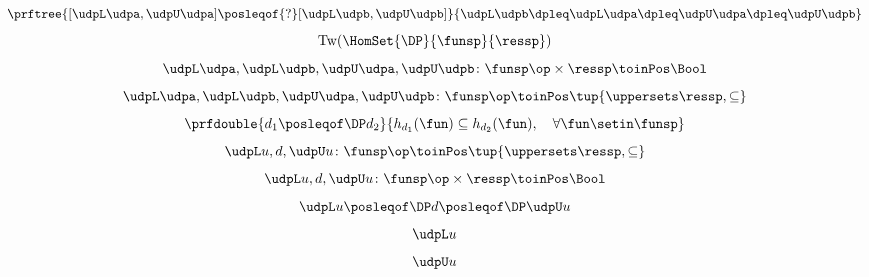 {\begin{forslides}
        \begin{equation*}
            \label{eq:order_udp_1}
            \prftree{[\udpL\udpa,\udpU\udpa] \posleqof{?} [\udpL\udpb,\udpU\udpb]}{\udpL\udpb\dpleq\udpL\udpa\dpleq\udpU\udpa\dpleq\udpU\udpb}
        \end{equation*}
        \begin{equation*}
            \label{eq:order_udp_2}
            \text{Tw}(\HomSet{\DP}{\funsp}{\ressp})
        \end{equation*}
        \begin{equation*}
            \label{eq:order_udp_3}
            \udpL\udpa,\udpL\udpb,\udpU\udpa,\udpU\udpb\colon \funsp\op \times \ressp \toinPos \Bool
        \end{equation*}
        \begin{equation*}
            \label{eq:order_udp_4}
            \udpL\udpa,\udpL\udpb,\udpU\udpa,\udpU\udpb\colon \funsp\op \toinPos  \tup{\uppersets \ressp, \subseteq}
        \end{equation*}
        \begin{equation*}
            \label{eq:upos_dp_def_4}
            \prfdouble{d_1\posleqof\DP d_2}{h_{d_1}(\fun)\subseteq h_{d_2}(\fun), \quad \forall \fun \setin \funsp}
        \end{equation*}
        \begin{equation*}
            \label{eq:order_udp_5}
            \udpL u,d,\udpU u\colon \funsp\op \toinPos  \tup{\uppersets \ressp, \subseteq}
        \end{equation*}
        \begin{equation*}
            \label{eq:order_udp_6}
            \udpL u,d,\udpU u\colon  \funsp\op \times \ressp \toinPos \Bool
        \end{equation*}
        \begin{equation*}
            \label{eq:order_udp_7}
            \udpL u \posleqof\DP d \posleqof\DP \udpU u
        \end{equation*}
        \begin{equation*}
            \label{eq:order_udp_8}
            \udpL u
        \end{equation*}
        \begin{equation*}
            \label{eq:order_udp_9}
            \udpU u
        \end{equation*}
        \begin{equation*}
            \label{eq:order_udp_10}
            \begin{aligned}

\end{aligned}
\end{equation*}
\end{forslides}}
